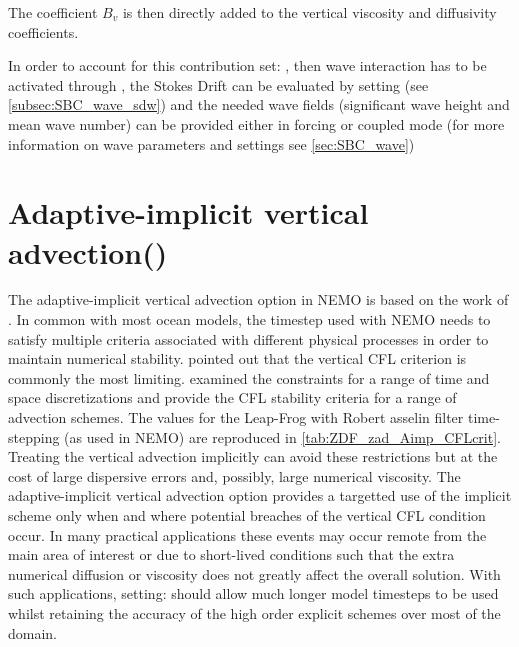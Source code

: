 \documentclass[../main/NEMO_manual]{subfiles}
\begin{document}
The coefficient $B_{v}$ is then directly added to the vertical viscosity
and diffusivity coefficients.

In order to account for this contribution set: ,
then wave interaction has to be activated through ,
the Stokes Drift can be evaluated by setting 
(see \autoref{subsec:SBC_wave_sdw})
and the needed wave fields (significant wave height and mean wave number) can be provided either in forcing or coupled mode
(for more information on wave parameters and settings see \autoref{sec:SBC_wave})

\section[Adaptive-implicit vertical advection (\forcode{ln_zad_Aimp})]{Adaptive-implicit vertical advection(\protect{})}
\label{subsec:ZDF_aimp}

The adaptive-implicit vertical advection option in NEMO is based on the work of
\citep{shchepetkin_OM15}.  In common with most ocean models, the timestep used with NEMO
needs to satisfy multiple criteria associated with different physical processes in order
to maintain numerical stability. \citep{shchepetkin_OM15} pointed out that the vertical
CFL criterion is commonly the most limiting. \citep{lemarie.debreu.ea_OM15} examined the
constraints for a range of time and space discretizations and provide the CFL stability
criteria for a range of advection schemes. The values for the Leap-Frog with Robert
asselin filter time-stepping (as used in NEMO) are reproduced in
\autoref{tab:ZDF_zad_Aimp_CFLcrit}. Treating the vertical advection implicitly can avoid these
restrictions but at the cost of large dispersive errors and, possibly, large numerical
viscosity. The adaptive-implicit vertical advection option provides a targetted use of the
implicit scheme only when and where potential breaches of the vertical CFL condition
occur. In many practical applications these events may occur remote from the main area of
interest or due to short-lived conditions such that the extra numerical diffusion or
viscosity does not greatly affect the overall solution. With such applications, setting:
 should allow much longer model timesteps to be used whilst
retaining the accuracy of the high order explicit schemes over most of the domain.
\end{document}
